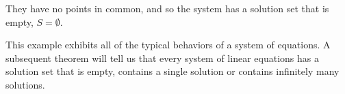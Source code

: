 \documentclass{ximera}
\begin{document}
\begin{problem}
\begin{example}
\begin{question}
      \begin{feedback}
        They have no points in common, and so the system has a solution set that is empty, $S=\emptyset$.
      \end{feedback}
    \end{question}

    This example exhibits all of the typical behaviors of a system of equations. A subsequent theorem will tell us that every system of linear equations has a solution set that is empty, contains a single solution or contains infinitely many solutions.
  \end{example}


\end{problem}
\end{document}
